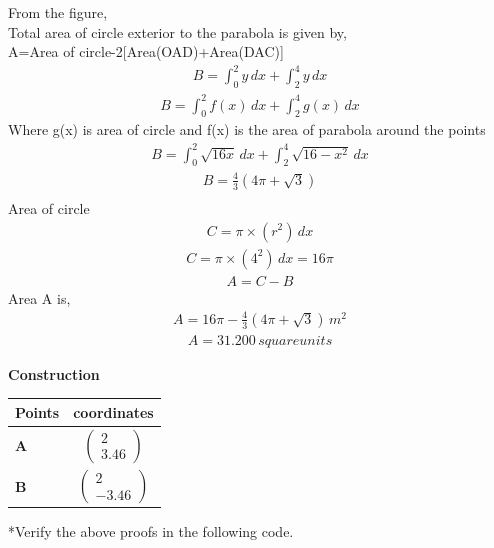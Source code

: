 \documentclass[10pt,a4paper]{report}
\newcommand{\myvec}[1]{\ensuremath{\begin{pmatrix}#1\end{pmatrix}}}
\let\vec\mathbf
\let\vec\mathbf
\begin{document}
\begin{multicols}{2}
 From the figure,\\ \vspace{1mm}
Total area of circle exterior to the parabola is given by, \\ \vspace{1mm}
A=Area of circle-2[Area(OAD)+Area(DAC)]
\begin{align}
 B=  \int_{0}^{2} y \,dx+\int_{2}^{4}y \,dx 
\end{align}
\begin{align}
 B=  \int_{0}^{2} f(x) \,dx+\int_{2}^{4} g(x)\,dx 
 \end{align}
 Where g(x) is area of circle and f(x) is the area of parabola around the points\\ \vspace{1mm}
\begin{align}
B= \int_{0}^{2} {\sqrt{16 x}}\,dx + \int_{2}^{4} {\sqrt{16-x^2}}\,dx 
\end{align}
\begin{align}
B=\frac{4}{3}(4\pi+\sqrt{3})\\
\end{align}
Area of circle\\
\begin{align}
C= \pi×(r^2)\,dx
\end{align}
\begin{align}
C= \pi×(4^2)\,dx=16\pi
\end{align}
\begin{align}
A= C-B
\end{align}
Area A is,\\ 
\begin{align}
    A= 16\pi-\frac{4}{3}(4\pi+\sqrt{3}) \,m^2
\end{align}
\begin{align}
    A= 31.200 \,square units
\end{align}

 \vspace{2mm} \textbf{Construction}
\begin{center}
\setlength{\arrayrulewidth}{0.5mm}
\setlength{\tabcolsep}{6pt}
\renewcommand{\arraystretch}{1.5}
    \begin{tabular}{|l|c|}
    \hline 
    \textbf{Points} & \textbf{coordinates} \\ \hline
   $\vec{A}$ & $\myvec{
   2\\
   3.46
   } $ \\\hline
   $\vec{B}$ & $\myvec{
   2\\
   -3.46
   } $ \\\hline
      \end{tabular}
  \end{center}

*Verify the above proofs in the following code.\\

 \end{multicols}
\end{document}
